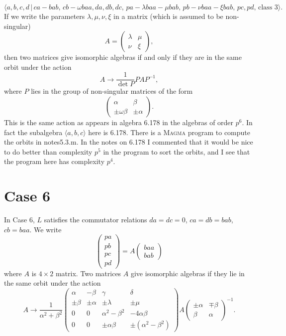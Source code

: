 \documentclass[12pt]{article}
\begin{document}
\[
\langle a,b,c,d\,|\,ca-bab,\,cb-\omega baa,da,db,dc,\,pa-\lambda baa-\mu
bab,\,pb-\nu baa-\xi bab,\,pc,pd,\,\text{class }3\rangle . 
\]%
If we write the parameters $\lambda ,\mu ,\nu ,\xi $ in a matrix (which is
assumed to be non-singular)%
\[
A=\left( 
\begin{array}{cc}
\lambda & \mu \\ 
\nu & \xi%
\end{array}%
\right) , 
\]%
then two matrices give isomorphic algebras if and only if they are in the
same orbit under the action%
\[
A\rightarrow \frac{1}{\det P}PAP^{-1}, 
\]%
where $P$ lies in the group of non-singular matrices of the form%
\[
\left( 
\begin{array}{ll}
\alpha & \beta \\ 
\pm \omega \beta & \pm \alpha%
\end{array}%
\right) . 
\]%
This is the same action as appears in algebra 6.178 in the algebras of order 
$p^{6}$. In fact the subalgebra $\langle a,b,c\rangle $ here is 6.178. There
is a \textsc{Magma} program to compute the orbits in notes5.3.m. In the
notes on 6.178 I commented that it would be nice to do better than
complexity $p^{5}$ in the program to sort the orbits, and I see that the
program here has complexity $p^{4}$.

\section{Case 6}

In Case 6, $L$ satisfies the commutator relations $da=dc=0$, $ca=db=bab$, $%
cb=baa$. We write%
\[
\left( 
\begin{array}{c}
pa \\ 
pb \\ 
pc \\ 
pd%
\end{array}%
\right) =A\left( 
\begin{array}{c}
baa \\ 
bab%
\end{array}%
\right) 
\]%
where $A$ is $4\times 2$ matrix. Two matrices $A$ give isomorphic algebras
if they lie in the same orbit under the action%
\[
A\rightarrow \frac{1}{\alpha ^{2}+\beta ^{2}}\left( 
\begin{array}{cccc}
\alpha & -\beta & \gamma & \delta \\ 
\pm \beta & \pm \alpha & \pm \lambda & \pm \mu \\ 
0 & 0 & \alpha ^{2}-\beta ^{2} & -4\alpha \beta \\ 
0 & 0 & \pm \alpha \beta & \pm (\alpha ^{2}-\beta ^{2})%
\end{array}%
\right) A\left( 
\begin{array}{cc}
\pm \alpha & \mp \beta \\ 
\beta & \alpha%
\end{array}%
\right) ^{-1}. 
\]
\end{document}
